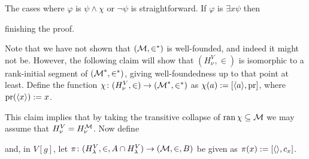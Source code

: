 \documentclass[../../main]{subfiles}
\begin{document}
{{    The cases where $\varphi$ is $\psi\land\chi$ or $\lnot\psi$ is straightforward. If $\varphi$ is $\exists x\psi$ then

    finishing the proof.
  }

  Note that we have not shown that $(\operatorname{\mathcal M},\in^*)$ is well-founded, and indeed it might not be. However, the following claim will show that $(H_\nu^V,\in)$ is isomorphic to a rank-initial segment of $(\operatorname{\mathcal M}^*, \in^*)$, giving well-foundedness up to that point at least. Define the function $\chi\colon(H_\nu^V,\in)\to(\operatorname{\mathcal M}^*,\in^*)$ as $\chi(a):=[\langle a\rangle,\text{pr}]$, where $\text{pr}(\langle x\rangle) := x$.



  This claim implies that by taking the transitive collapse of $\operatorname{ran}\chi\subseteq\operatorname{\mathcal M}$ we may assume that $H_\nu^V = H_\nu^{\operatorname{\mathcal M}}$. Now define
  
  and, in $V[g]$, let $\pi\colon (H_\lambda^V,\in,A\cap H_\lambda^V)\to(\operatorname{\mathcal M},\in, B)$ be given as $\pi(x) := [\langle \rangle,c_x]$. 
  

}
\end{document}

